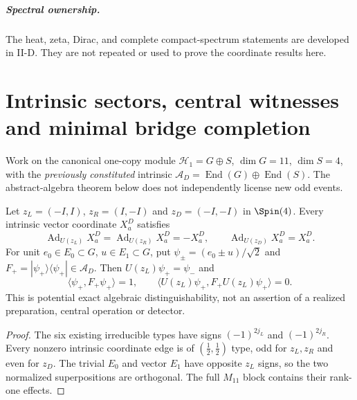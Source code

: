 \documentclass[12pt,a4paper]{article}
\begin{document}
\subparagraph{Spectral ownership.}
The heat, zeta, Dirac, and complete compact-spectrum statements are developed
in II-D.  They are not repeated or used to prove the coordinate results here.





\section{Intrinsic sectors, central witnesses and minimal bridge completion}
\label{p2c:sec:v352-center-bridge}
Work on the canonical one-copy module
$\mathcal H_1=G\oplus S$, $\dim G=11$, $\dim S=4$, with the
\emph{previously constituted} intrinsic
$\mathcal A_D=\operatorname{End}(G)\oplus\operatorname{End}(S)$.
The abstract-algebra theorem below does not independently license
new odd events.

\begin{proposition}
\label{p2c:prop:v352-center-witness}
Let $z_L=(-I,I)$, $z_R=(I,-I)$ and $z_D=(-I,-I)$ in
$\Spin(4)$.  Every intrinsic vector coordinate $X_a^D$ satisfies
\[
 \operatorname{Ad}_{U(z_L)}X_a^D
 =\operatorname{Ad}_{U(z_R)}X_a^D=-X_a^D,
 \qquad\operatorname{Ad}_{U(z_D)}X_a^D=X_a^D.
\]
For unit $e_0\in E_0\subset G$, $u\in E_1\subset G$,
put $\psi_\pm=(e_0\pm u)/\sqrt2$ and
$F_+=|\psi_+\rangle\langle\psi_+|\in\mathcal A_D$.
Then $U(z_L)\psi_+=\psi_-$ and
\[
 \langle\psi_+,F_+\psi_+\rangle=1,\qquad
 \langle U(z_L)\psi_+,F_+U(z_L)\psi_+\rangle=0.
\]
This is potential exact algebraic distinguishability, not an
assertion of a realized preparation, central operation or detector.
\end{proposition}
\begin{proof}
The six existing irreducible types have signs $(-1)^{2j_L}$
and $(-1)^{2j_R}$.  Every nonzero intrinsic coordinate edge is
of $(\tfrac12,\tfrac12)$ type, odd for $z_L,z_R$ and even for
$z_D$.  The trivial $E_0$ and vector $E_1$ have opposite
$z_L$ signs, so the two normalized superpositions are orthogonal.
The full $M_{11}$ block contains their rank-one effects.
\end{proof}
\end{document}
